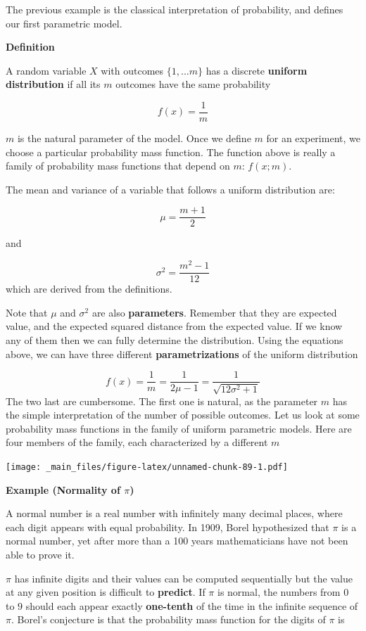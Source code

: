 \documentclass[
]{book}
\begin{document}
The previous example is the classical interpretation of probability, and defines our first parametric model.

\textbf{Definition}

A random variable \(X\) with outcomes \(\{1,...m\}\) has a discrete \textbf{uniform distribution} if all its \(m\) outcomes have the same probability

\[f(x)=\frac{1}{m}\]

\(m\) is the natural parameter of the model. Once we define \(m\) for an experiment, we choose a particular probability mass function. The function above is really a family of probability mass functions that depend on \(m\): \(f(x; m)\).

The mean and variance of a variable that follows a uniform distribution are:

\[\mu= \frac{m+1}{2}\]

and

\[\sigma^2= \frac{m^2-1}{12}\]
which are derived from the definitions.

Note that \(\mu\) and \(\sigma^2\) are also \textbf{parameters}. Remember that they are expected value, and the expected squared distance from the expected value. If we know any of them then we can fully determine the distribution. Using the equations above, we can have three different \textbf{parametrizations} of the uniform distribution

\[f(x)=\frac{1}{m}=\frac{1}{2\mu-1}=\frac{1}{\sqrt{12\sigma^2+1}}\]
The two last are cumbersome. The first one is natural, as the parameter \(m\) has the simple interpretation of the number of possible outcomes. Let us look at some probability mass functions in the family of uniform parametric models. Here are four members of the family, each characterized by a different \(m\)

\texttt{[image: \_main\_files/figure-latex/unnamed-chunk-89-1.pdf]}

\textbf{Example (Normality of \(\pi\))}

A normal number is a real number with infinitely many decimal places, where each digit appears with equal probability. In 1909, Borel hypothesized that \(\pi\) is a normal number, yet after more than a 100 years mathematicians have not been able to prove it.

\(\pi\) has infinite digits and their values can be computed sequentially but the value at any given position is difficult to \textbf{predict}. If \(\pi\) is normal, the numbers from \(0\) to \(9\) should each appear exactly \textbf{one-tenth} of the time in the infinite sequence of \(\pi\). Borel's conjecture is that the probability mass function for the digits of \(\pi\) is
\end{document}
